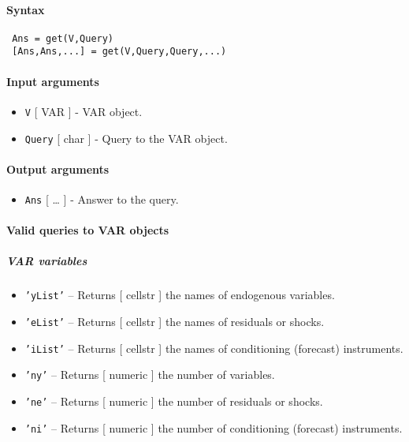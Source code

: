 


	\paragraph{Syntax}
 
 \begin{verbatim}
 Ans = get(V,Query)
 [Ans,Ans,...] = get(V,Query,Query,...)
 \end{verbatim}
 
 \paragraph{Input arguments}
 
 \begin{itemize}
 \item
   \texttt{V} {[} VAR {]} - VAR object.
 \item
   \texttt{Query} {[} char {]} - Query to the VAR object.
 \end{itemize}
 
 \paragraph{Output arguments}
 
 \begin{itemize}
 \item
   \texttt{Ans} {[} \ldots{} {]} - Answer to the query.
 \end{itemize}
 
 \paragraph{Valid queries to VAR objects}
 
 \subparagraph{VAR variables}
 
 \begin{itemize}
 \item
   \texttt{'yList'} -- Returns {[} cellstr {]} the names of endogenous
   variables.
 \item
   \texttt{'eList'} -- Returns {[} cellstr {]} the names of residuals or
   shocks.
 \item
   \texttt{'iList'} -- Returns {[} cellstr {]} the names of conditioning
   (forecast) instruments.
 \item
   \texttt{'ny'} -- Returns {[} numeric {]} the number of variables.
 \item
   \texttt{'ne'} -- Returns {[} numeric {]} the number of residuals or
   shocks.
 \item
   \texttt{'ni'} -- Returns {[} numeric {]} the number of conditioning
   (forecast) instruments.
 \end{itemize}
 
